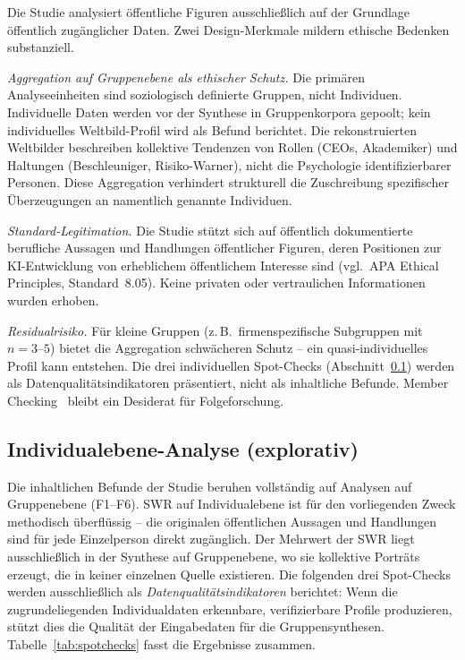 \documentclass[12pt,a4paper]{article}
\begin{document}
Die Studie analysiert öffentliche Figuren ausschließlich auf der Grundlage öffentlich zugänglicher Daten. Zwei Design-Merkmale mildern ethische Bedenken substanziell.

\emph{Aggregation auf Gruppenebene als ethischer Schutz.} Die primären Analyseeinheiten sind soziologisch definierte Gruppen, nicht Individuen. Individuelle Daten werden vor der Synthese in Gruppenkorpora gepoolt; kein individuelles Weltbild-Profil wird als Befund berichtet. Die rekonstruierten Weltbilder beschreiben kollektive Tendenzen von Rollen (CEOs, Akademiker) und Haltungen (Beschleuniger, Risiko-Warner), nicht die Psychologie identifizierbarer Personen. Diese Aggregation verhindert strukturell die Zuschreibung spezifischer Überzeugungen an namentlich genannte Individuen.

\emph{Standard-Legitimation.} Die Studie stützt sich auf öffentlich dokumentierte berufliche Aussagen und Handlungen öffentlicher Figuren, deren Positionen zur KI-Entwicklung von erheblichem öffentlichem Interesse sind (vgl.\ APA Ethical Principles, Standard~8.05). Keine privaten oder vertraulichen Informationen wurden erhoben.

\emph{Residualrisiko.} Für kleine Gruppen (z.\,B.\ firmenspezifische Subgruppen mit $n = 3\text{--}5$) bietet die Aggregation schwächeren Schutz -- ein quasi-individuelles Profil kann entstehen. Die drei individuellen Spot-Checks (Abschnitt~\ref{sec:limitationen:spotchecks}) werden als Datenqualitätsindikatoren präsentiert, nicht als inhaltliche Befunde. Member Checking~\citep{SoysalTurkmen2024} bleibt ein Desiderat für Folgeforschung.


\subsection{Individualebene-Analyse (explorativ)}
\label{sec:limitationen:spotchecks}

Die inhaltlichen Befunde der Studie beruhen vollständig auf Analysen auf Gruppenebene (F1--F6). SWR auf Individualebene ist für den vorliegenden Zweck methodisch überflüssig -- die originalen öffentlichen Aussagen und Handlungen sind für jede Einzelperson direkt zugänglich. Der Mehrwert der SWR liegt ausschließlich in der Synthese auf Gruppenebene, wo sie kollektive Porträts erzeugt, die in keiner einzelnen Quelle existieren. Die folgenden drei Spot-Checks werden ausschließlich als \emph{Datenqualitätsindikatoren} berichtet: Wenn die zugrundeliegenden Individualdaten erkennbare, verifizierbare Profile produzieren, stützt dies die Qualität der Eingabedaten für die Gruppensynthesen. Tabelle~\ref{tab:spotchecks} fasst die Ergebnisse zusammen.
\end{document}
